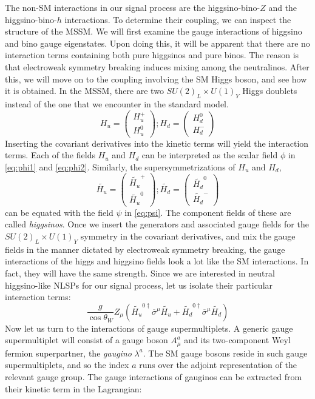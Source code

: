 The non-SM interactions in our signal process are the higgsino-bino-$Z$ and the higgsino-bino-$h$ interactions. To determine their coupling, we can inspect the structure of the MSSM. We will first examine the gauge interactions of higgsino and bino gauge eigenstates. Upon doing this, it will be apparent that there are no interaction terms containing both pure higgsinos and pure binos. The reason is that electroweak symmetry breaking induces mixing among the neutralinos. After this, we will move on to the coupling involving the SM Higgs boson, and see how it is obtained. 
In the MSSM, there are two $SU(2)_L\times U(1)_Y$ Higgs doublets instead of the one that we encounter in the standard model.
\[H_u = \begin{pmatrix}H_u^+\\H_u^0\end{pmatrix};
H_d = \begin{pmatrix}H_d^0\\H_d^-\end{pmatrix}\]
Inserting the covariant derivatives into the kinetic terms will yield the interaction terms. Each of the fields $H_u$ and $H_d$ can be interpreted as the scalar field $\phi$ in \eqref{eq:phi1} and \eqref{eq:phi2}. Similarly, the supersymmetrizations of $H_u$ and $H_d$,
\[\widetilde{H_u} = \begin{pmatrix}\widetilde{H_u}^+\\\widetilde{H_u}^0\end{pmatrix};
\widetilde{H_d} = \begin{pmatrix}\widetilde{H_d}^0\\\widetilde{H_d}^-\end{pmatrix}\]
can be equated with the field $\psi$ in \eqref{eq:psi}. The component fields of these are called \emph{higgsinos}. Once we insert the generators and associated gauge fields for the $SU(2)_L\times U(1)_Y$ symmetry in the covariant derivatives, and mix the gauge fields in the manner dictated by electroweak symmetry breaking, the gauge interactions of the higgs and higgsino fields look a lot like the SM interactions. In fact, they will have the same strength. Since we are interested in neutral higgsino-like NLSPs for our signal process, let us isolate their particular interaction terms:
\[\frac{g}{\cos\theta_W}Z_\mu\left(\widetilde{H_u}^{0\dagger}\overline{\sigma}^\mu \widetilde{H_u}+
\widetilde{H_d}^{0\dagger}\overline{\sigma}^\mu \widetilde{H_d}\right)\]
Now let us turn to the interactions of gauge supermultiplets. A generic gauge supermultiplet will consist of a gauge boson $A_\mu^a$ and its two-component Weyl fermion superpartner, the \emph{gaugino} $\lambda^a$. The SM gauge bosons reside in such gauge supermultiplets, and so the index $a$ runs over the adjoint representation of the relevant gauge group. The gauge interactions of gauginos can be extracted from their kinetic term in the Lagrangian:
